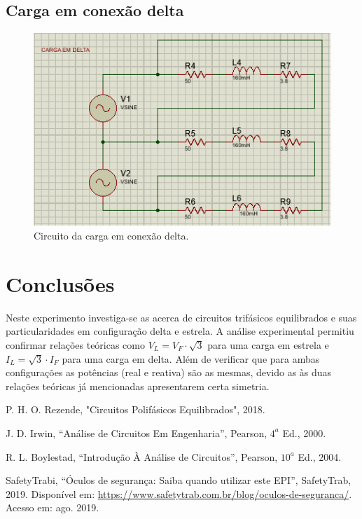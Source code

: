 \documentclass[a4paper,12pt,oneside,openany,table,xcdraw]{article}
\begin{document}
\subsection{Carga em conexão delta}
\begin{figure}[H]
\centering
\captionsetup{font=scriptsize}
\includegraphics[width=14cm]{sim2}
\caption{Circuito da carga em conexão delta.}
\label{sim2}
\end{figure}

\section{Conclusões} %
Neste experimento investiga-se as acerca de circuitos trifásicos equilibrados e suas particularidades em configuração delta e estrela. A análise experimental permitiu confirmar relações teóricas como $V_L=V_F\cdot\sqrt{3}$ para uma carga em estrela e $I_L = \sqrt{3}\cdot I_F$ para uma carga em delta. Além de verificar que para ambas configurações as potências (real e reativa) são as mesmas, devido as às duas relações teóricas já mencionadas apresentarem certa simetria.

\newpage
\begin{thebibliography}{9} 
    P. H. O. Rezende,
    "Circuitos Polifásicos Equilibrados", 2018.

    J. D. Irwin,
    “Análise de Circuitos Em Engenharia”, Pearson, $4^a$ Ed., 2000.

    R. L. Boylestad,
    “Introdução À Análise de Circuitos”, Pearson, $10^a$ Ed., 2004.

    SafetyTrabi,
    “Óculos de segurança: Saiba quando utilizar este EPI”, SafetyTrab, 2019.
 Disponível em:
 \url{https://www.safetytrab.com.br/blog/oculos-de-seguranca/}. Acesso em: ago. 2019.


\end{thebibliography}
\end{document}
